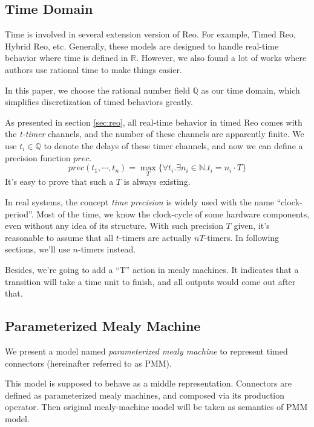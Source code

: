 \documentclass[conference, a4paper]{IEEEtran}
\begin{document}
\subsection{Time Domain}
Time is involved in several extension version of Reo. For example, Timed
Reo\cite{DBLP:conf/sefm/ArbabBBR04}, Hybrid Reo\cite{DBLP:conf/icfem/ChenSS14}, etc.
Generally, these models are designed to handle real-time behavior where time is defined in
$\mathbb{R}$. However, we also found a lot of works where authors use rational time to make things
easier.

In this paper, we choose the rational number field $\mathbb{Q}$ as our time domain, which simplifies
discretization of timed behaviors greatly.

As presented in section \ref{sec:reo}, all real-time behavior in timed Reo comes with the
\emph{t-timer} channels, and the number of these channels are apparently finite. We use
$t_i\in\mathbb{Q}$ to denote the delays of these timer channels, and now we can define a precision
function $prec$.
\[
prec(t_1,\cdots,t_n) = \max_T\{\forall t_i.\exists n_i\in\mathbb{N}.t_i=n_i\cdot T\}
\]
It's easy to prove that such a $T$ is always existing.

In real systems, the concept \emph{time precision} is widely used with the name ``clock-period''.
Most of the time, we know the clock-cycle of some hardware components, even without any idea of its
structure. With such precision $T$ given, it's reasonable to assume that all $t$-timers are actually
$nT$-timers. In following sections, we'll use $n$-timers instead.

Besides, we're going to add a ``T'' action in mealy machines. It indicates that a transition
will take a time unit to finish, and all outputs would come out after that.

\subsection{Parameterized Mealy Machine}
We present a model named \emph{parameterized mealy machine} to represent timed connectors
(hereinafter referred to as PMM). 

This model is supposed to behave as a middle representation. Connectors are defined as parameterized
mealy machines, and composed via its production operator. Then original mealy-machine model will be
taken as semantics of PMM model.
\end{document}
